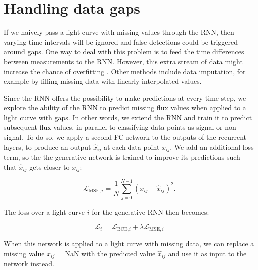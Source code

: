
\section{Handling data gaps}

If we naively pass a light curve with missing values through the RNN, then varying time intervals will be ignored and false detections could be triggered around gaps. One way to deal with this problem is to feed the time differences between measurements to the RNN. However, this extra stream of data might increase the chance of overfitting . Other methods include data imputation, for example by filling missing data with linearly interpolated values.

Since the RNN offers the possibility to make predictions at every time step, we explore the ability of the RNN to predict missing flux values when applied to a light curve with gaps. In other words, we extend the RNN and train it to predict subsequent flux values, in parallel to classifying data points as signal or non-signal. To do so, we apply a second FC-network to the outputs of the recurrent layers, to produce an output $\hat{x}_{ij}$ at each data point $x_{ij}$. We add an additional loss term, so the the generative network is trained to improve its predictions such that $\hat{x}_{ij}$ gets closer to $x_{ij}$:

\begin{equation}
    \mathcal{L}_{\text{MSE},i} = \frac{1}{N}\sum^{N-1}_{j=0} (x_{ij} - \hat{x}_{ij})^2.
\end{equation}

\noindent The loss over a light curve $i$ for the generative RNN then becomes:

\begin{equation}
    \mathcal{L}_i = \mathcal{L}_{\text{BCE},i} + \lambda \mathcal{L}_{\text{MSE},i}
\end{equation}


\noindent When this network is applied to a light curve with missing data, we can replace a missing value $x_{ij}$ = NaN with the predicted value $\hat{x}_{ij}$ and use it as input to the network instead.